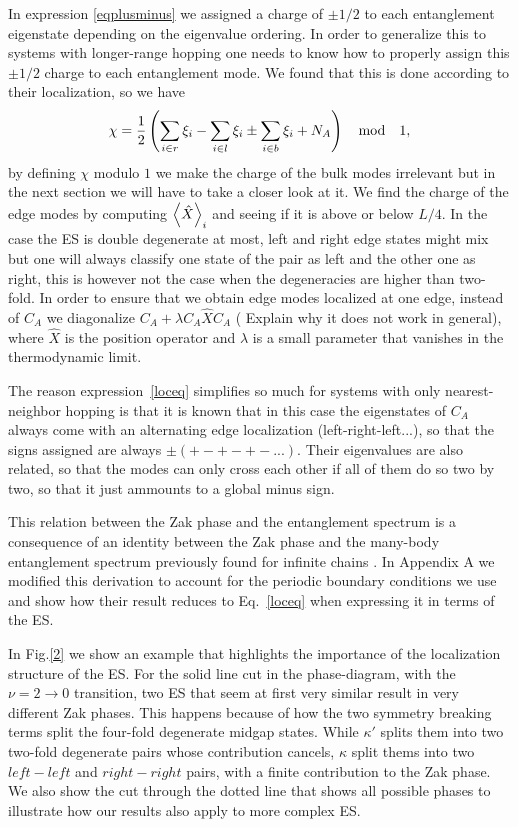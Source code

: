 \documentclass[twocolumn,amsmath,longbibliography,amssymb,superscriptaddress]{revtex4-1}
\newcommand{\carlos}[1]{{\color{red} #1}}
\begin{document}
In expression 	\eqref{eqplusminus} we assigned a charge of $\pm1/2$ to each entanglement eigenstate depending on the eigenvalue ordering. 
In order to generalize this to systems with longer-range hopping one needs to know how to properly assign this $\pm 1/2$ charge to each entanglement mode. We found that this is done according to their localization, so we have
\begin{equation}
\chi = \frac{1}{2} \left( \sum_{i\in r}\xi_i-\sum_{i\in l}\xi_i \pm \sum_{i\in b}\xi_i  + N_A \right) \quad {\rm mod} \quad 1,
\label{loceq}
\end{equation}
by defining $ \chi$ modulo $1$ we make the charge of the bulk modes irrelevant but in the next section we will have to take a closer look at it. We find the charge of the edge modes by computing $\expval{\hat{X}}_i$ and seeing if it is above or below $L/4$. In the case the ES is double degenerate at most, left and right edge states might mix but one will always classify one state of the pair as left and the other one as right, this is however not the case when the degeneracies are higher than two-fold. In order to ensure that we obtain edge modes localized at one edge, instead of $C_A$ we diagonalize $C_A + \lambda C_A\hat{X}C_A$ (\carlos{Explain why it does not work in general}), where $\hat{X}$ is the position operator and $\lambda$ is a small parameter that vanishes in the thermodynamic limit. 

The reason expression~\eqref{loceq} simplifies so much for systems with only nearest-neighbor hopping is that it is known that in this case the eigenstates of $C_A$ always come with an alternating edge localization (left-right-left...), so that the signs assigned are always $ \pm(+-+-+-...)$. Their eigenvalues are also related, so that the modes can only cross each other if all of them do so two by two, so that it just ammounts to a global minus sign.

This relation between the Zak phase and the entanglement spectrum is a consequence of an identity between the Zak phase and the many-body entanglement spectrum previously found for infinite chains \cite{Zaletel2014}. In Appendix A we modified this derivation to account for the periodic boundary conditions we use and show how their result reduces to Eq.~\eqref{loceq} when expressing it in terms of the ES.

In Fig.\ref{2} we show an example that highlights the importance of the localization structure of the ES. For the solid line cut in the phase-diagram, with the $\nu = 2 \rightarrow 0 $ transition, two ES that seem at first very similar result in very different Zak phases. This happens because of how the two symmetry breaking terms split the four-fold degenerate midgap states. While $\kappa'$ splits them into two two-fold degenerate pairs whose contribution cancels, $\kappa$ split thems into two $left-left$ and $right-right$ pairs, with a finite contribution to the Zak phase. We also show the cut through the dotted line that shows all possible phases to illustrate how our results also apply to more complex ES. 
\end{document}
